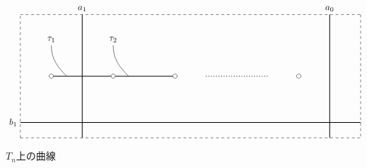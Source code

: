 \documentclass[uplatex, a4paper, dvipdfmx]{jsarticle}
\theoremstyle{definition}
\begin{document}
\begin{figure}[h]
    \centering
    \begin{displaymath}
        \begin{tikzpicture}[scale=1.2]
            \draw[dashed] (0,0)--(11,0);
            \draw[dashed] (0,0)--(0,4);
            \draw[dashed] (0,4)--(11,4);
            \draw[dashed] (11,4)--(11,0);

            \draw[thick] (1, 2)--(3, 2);
            \draw[thick] (3, 2)--(5, 2);

            \draw[thick] (0, 0.5)--(11, 0.5);

            \draw[thick] (2, 0)--(2, 4);
            \draw[thick] (10, 0)--(10, 4);

            \draw[dotted, thick] (5+1, 2)--(9-1, 2);
            \foreach \u in {1, 3, 5, 9}
                {
                    \filldraw[white] (\u, 2) circle (2pt);
                    \draw[black] (\u, 2) circle (2pt);
                }

            \draw(0, 0.5) node[left]{$b_1$};
            \draw(2, 4) node[above]{$a_1$};
            \draw(10, 4) node[above]{$a_0$};

            \draw(1, 3) node[above]{$\tau_1$};
            \draw(1, 3) to[out=-90,in=135](1.5, 2);
            \draw(3, 3) node[above]{$\tau_2$};
            \draw(3, 3) to[out=-90,in=135](3.5, 2);



        \end{tikzpicture}
    \end{displaymath}
    \caption{$T_n$上の曲線} \label{curves_on_T_n}
\end{figure}
\end{document}
